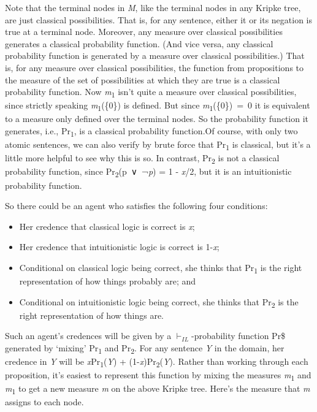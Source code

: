 \documentclass[
  10pt,
  letterpaper,
  DIV=11,
  numbers=noendperiod,
  twoside]{scrartcl}
\providecommand{\tightlist}{%
  \setlength{\itemsep}{0pt}\setlength{\parskip}{0pt}}\usepackage{longtable,booktabs,array}
\begin{document}
Note that the terminal nodes in \emph{M}, like the terminal nodes in any
Kripke tree, are just classical possibilities. That is, for any
sentence, either it or its negation is true at a terminal node.
Moreover, any measure over classical possibilities generates a classical
probability function. (And vice versa, any classical probability
function is generated by a measure over classical possibilities.) That
is, for any measure over classical possibilities, the function from
propositions to the measure of the set of possibilities at which they
are true is a classical probability function. Now
\emph{m}\textsubscript{1} isn't quite a measure over classical
possibilities, since strictly speaking \emph{m}\textsubscript{1}(\{0\})
is defined. But since \emph{m}\textsubscript{1}(\{0\})~=~0 it is
equivalent to a measure only defined over the terminal nodes. So the
probability function it generates, i.e., Pr\textsubscript{1}, is a
classical probability function.Of course, with only two atomic
sentences, we can also verify by brute force that Pr\textsubscript{1} is
classical, but it's a little more helpful to see why this is so. In
contrast, Pr\textsubscript{2} is not a classical probability function,
since Pr\textsubscript{2}(p~∨~¬\emph{p}) = 1 - \emph{x}/2, but it is an
intuitionistic probability function.

So there could be an agent who satisfies the following four conditions:

\begin{itemize}
\tightlist
\item
  Her credence that classical logic is correct is \emph{x};
\item
  Her credence that intuitionistic logic is correct is 1-\emph{x};
\item
  Conditional on classical logic being correct, she thinks that
  Pr\textsubscript{1} is the right representation of how things probably
  are; and
\item
  Conditional on intuitionistic logic being correct, she thinks that
  Pr\textsubscript{2} is the right representation of how things are.
\end{itemize}

Such an agent's credences will be given by a \(\vdash_{IL}\)-probability
function Pr\$ generated by `mixing' Pr\textsubscript{1} and
Pr\textsubscript{2}. For any sentence \emph{Y} in the domain, her
credence in \emph{Y} will be \emph{x}Pr\textsubscript{1}(\emph{Y}) +
(1-\emph{x})Pr\textsubscript{2}(\emph{Y}). Rather than working through
each proposition, it's easiest to represent this function by mixing the
measures \emph{m}\textsubscript{1} and \emph{m}\textsubscript{1} to get
a new measure \emph{m} on the above Kripke tree. Here's the measure that
\emph{m} assigns to each node.
\end{document}
